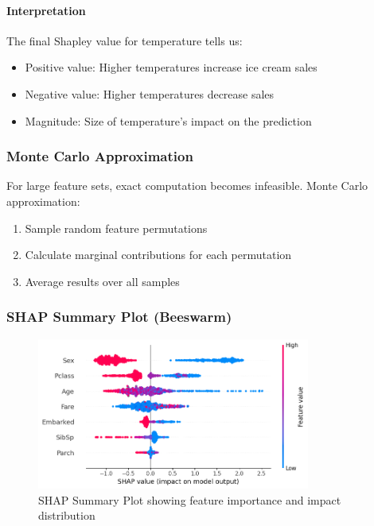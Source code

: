 \documentclass{article}
\begin{document}
\paragraph{Interpretation}
The final Shapley value for temperature tells us:
\begin{itemize}
    \item Positive value: Higher temperatures increase ice cream sales
    \item Negative value: Higher temperatures decrease sales
    \item Magnitude: Size of temperature's impact on the prediction
\end{itemize}

\subsubsection{Monte Carlo Approximation}
For large feature sets, exact computation becomes infeasible. Monte Carlo approximation:
\begin{enumerate}
    \item Sample random feature permutations
    \item Calculate marginal contributions for each permutation
    \item Average results over all samples
\end{enumerate}

\subsubsection{SHAP Summary Plot (Beeswarm)}
\begin{figure}[h]
    \centering
    \includegraphics[width=0.8\textwidth]{images/bee_swarm.png}
    \caption{SHAP Summary Plot showing feature importance and impact distribution}
    \label{fig:shap_summary}
\end{figure}
\end{document}
